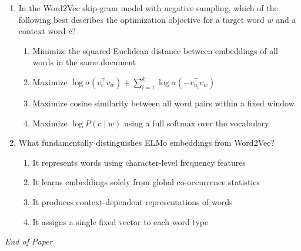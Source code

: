 \documentclass[12pt]{article}
\begin{document}
\begin{enumerate}[label=Q\arabic*.]
 \item In the Word2Vec skip-gram model with negative sampling, which of the following best describes the optimization objective for a target word $w$ and a context word $c$?
 \begin{enumerate}[label=(\Alph*)]
     \item Minimize the squared Euclidean distance between embeddings of all words in the same document
     \item Maximize $\log \sigma(v_c^\top v_w) + \sum_{i=1}^{k} \log \sigma(-v_{n_i}^\top v_w)$
     \item Maximize cosine similarity between all word pairs within a fixed window
     \item Maximize $\log P(c \mid w)$ using a full softmax over the vocabulary
 \end{enumerate}
 
 \item What fundamentally distinguishes ELMo embeddings from Word2Vec?
 \begin{enumerate}[label=(\Alph*)]
     \item It represents words using character-level frequency features
     \item It learns embeddings solely from global co-occurrence statistics
     \item It produces context-dependent representations of words
     \item It assigns a single fixed vector to each word type
 \end{enumerate}
 
 \end{enumerate}
 
 \vfill
 \noindent\textit{End of Paper}
 
 
\end{document}
